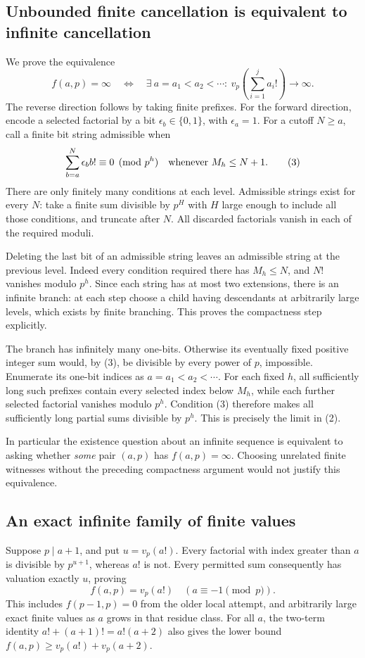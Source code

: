 \subsection*{Unbounded finite cancellation is equivalent to infinite cancellation}
We prove the equivalence
\[
 f(a,p)=\infty
 \quad\Longleftrightarrow\quad
 \exists\ a=a_1<a_2<\cdots:\
 v_p\left(\sum_{i=1}^j a_i!\right)\longrightarrow\infty. \tag{2}
\]
The reverse direction follows by taking finite prefixes.
For the forward direction, encode a selected factorial by a bit $\epsilon_b\in\{0,1\}$, with $\epsilon_a=1$. For a cutoff $N\ge a$, call a finite bit string admissible when
\[
 \sum_{b=a}^N\epsilon_b b!\equiv0\pmod{p^h}
 \quad\hbox{whenever }M_h\le N+1. \tag{3}
\]
There are only finitely many conditions at each level. Admissible strings exist for every $N$: take a finite sum divisible by $p^H$ with $H$ large enough to include all those conditions, and truncate after $N$. All discarded factorials vanish in each of the required moduli.

Deleting the last bit of an admissible string leaves an admissible string at the previous level. Indeed every condition required there has $M_h\le N$, and $N!$ vanishes modulo $p^h$. Since each string has at most two extensions, there is an infinite branch: at each step choose a child having descendants at arbitrarily large levels, which exists by finite branching. This proves the compactness step explicitly.

The branch has infinitely many one-bits. Otherwise its eventually fixed positive integer sum would, by (3), be divisible by every power of $p$, impossible. Enumerate its one-bit indices as $a=a_1<a_2<\cdots$. For each fixed $h$, all sufficiently long such prefixes contain every selected index below $M_h$, while each further selected factorial vanishes modulo $p^h$. Condition (3) therefore makes all sufficiently long partial sums divisible by $p^h$. This is precisely the limit in (2).

In particular the existence question about an infinite sequence is equivalent to asking whether \emph{some} pair $(a,p)$ has $f(a,p)=\infty$. Choosing unrelated finite witnesses without the preceding compactness argument would not justify this equivalence.

\subsection*{An exact infinite family of finite values}
Suppose $p\mid a+1$, and put $u=v_p(a!)$. Every factorial with index greater than $a$ is divisible by $p^{u+1}$, whereas $a!$ is not. Every permitted sum consequently has valuation exactly $u$, proving
\[
 f(a,p)=v_p(a!)\quad(a\equiv-1\pmod p). \tag{4}
\]
This includes $f(p-1,p)=0$ from the older local attempt, and arbitrarily large exact finite values as $a$ grows in that residue class.
For all $a$, the two-term identity $a!+(a+1)!=a!(a+2)$ also gives the lower bound $f(a,p)\ge v_p(a!)+v_p(a+2)$.

